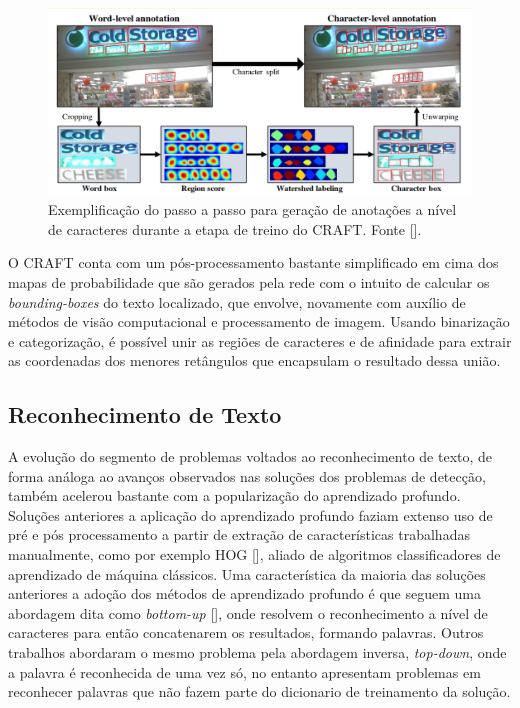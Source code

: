 \begin{figure}
    \centering
    \includegraphics[width=\textwidth]{figs/craft-char-level-annotation.png}
    \caption{Exemplificação do passo a passo para geração de anotações a nível de caracteres durante a etapa de treino do CRAFT. Fonte [].}
    \label{fig:craft_char_level_annotation}
\end{figure}

O CRAFT conta com um pós-processamento bastante simplificado em cima dos mapas de probabilidade que são gerados pela rede com o intuito de calcular os \textit{bounding-boxes} do texto localizado, que envolve, novamente com auxílio de métodos de visão computacional e processamento de imagem. Usando binarização e categorização, é possível unir as regiões de caracteres e de afinidade para extrair as coordenadas dos menores retângulos que encapsulam o resultado dessa união.


\subsection{Reconhecimento de Texto}
A evolução do segmento de problemas voltados ao reconhecimento de texto, de forma análoga ao avanços observados nas soluções dos problemas de detecção, também acelerou bastante com a popularização do aprendizado profundo. Soluções anteriores a aplicação do aprendizado profundo faziam extenso uso de pré e pós processamento a partir de extração de características trabalhadas manualmente, como por exemplo HOG [], aliado de algoritmos classificadores de aprendizado de máquina clássicos. Uma característica da maioria das soluções anteriores a adoção dos métodos de aprendizado profundo é que seguem uma abordagem dita como \textit{bottom-up} [], onde resolvem o reconhecimento a nível de caracteres para então concatenarem os resultados, formando palavras. Outros trabalhos abordaram o mesmo problema pela abordagem inversa, \textit{top-down}, onde a palavra é reconhecida de uma vez só, no entanto apresentam problemas em reconhecer palavras que não fazem parte do dicionario de treinamento da solução.

